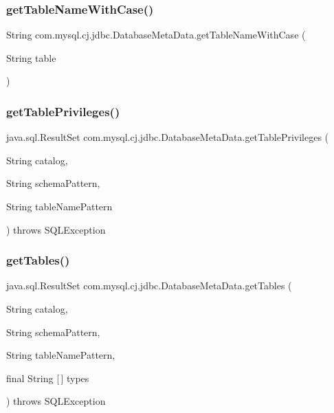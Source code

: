 \subsubsection{\texorpdfstring{get\+Table\+Name\+With\+Case()}{getTableNameWithCase()}}
{\footnotesize\ttfamily String com.\+mysql.\+cj.\+jdbc.\+Database\+Meta\+Data.\+get\+Table\+Name\+With\+Case (\begin{DoxyParamCaption}\item[{String}]{table }\end{DoxyParamCaption})\hspace{0.3cm}{\ttfamily [protected]}}

\mbox{\label{classcom_1_1mysql_1_1cj_1_1jdbc_1_1_database_meta_data_adf4cdd4f2a6189234a11e9a7c27be8b1}} 
\subsubsection{\texorpdfstring{get\+Table\+Privileges()}{getTablePrivileges()}}
{\footnotesize\ttfamily java.\+sql.\+Result\+Set com.\+mysql.\+cj.\+jdbc.\+Database\+Meta\+Data.\+get\+Table\+Privileges (\begin{DoxyParamCaption}\item[{String}]{catalog,  }\item[{String}]{schema\+Pattern,  }\item[{String}]{table\+Name\+Pattern }\end{DoxyParamCaption}) throws S\+Q\+L\+Exception}

\mbox{\label{classcom_1_1mysql_1_1cj_1_1jdbc_1_1_database_meta_data_ab5f3f694cbfe95c1f5b7f0afd6ff79d4}} 
\subsubsection{\texorpdfstring{get\+Tables()}{getTables()}}
{\footnotesize\ttfamily java.\+sql.\+Result\+Set com.\+mysql.\+cj.\+jdbc.\+Database\+Meta\+Data.\+get\+Tables (\begin{DoxyParamCaption}\item[{String}]{catalog,  }\item[{String}]{schema\+Pattern,  }\item[{String}]{table\+Name\+Pattern,  }\item[{final String \mbox{[}$\,$\mbox{]}}]{types }\end{DoxyParamCaption}) throws S\+Q\+L\+Exception}

